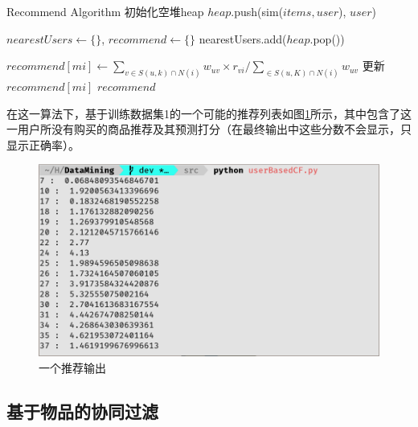 \documentclass{article}
\begin{document}
\begin{simpleAlgorithm}{Recommend Algorithm}
    \State 初始化空堆heap
     
            
                \State \(heap\).push({sim(\(items, user\)), \(user\)})
            \EndIf
        \EndFor
    \EndFor

    \State \(nearestUsers \leftarrow \{\}\), \(recommend \leftarrow \{\}\)
      
        \State nearestUsers.add(\(heap\).pop())
    \EndFor

      
                \State \(recommend[mi] \leftarrow \sum_{v\in S(u,k)\cap N(i)} w_{uv}\times r_{vi} / \sum_{\in S(u,K)\cap N(i)} w_{uv}\)
            \Else
                \State 更新\(recommend[mi]\)
            \EndIf
        \EndFor
    \EndFor
    \State \Return \(recommend\)
    \EndProcedure
\end{simpleAlgorithm}

\par 在这一算法下，基于训练数据集1的一个可能的推荐列表如图\ref{fig:userOutput}所示，其中包含了这一用户所没有购买的商品推荐及其预测打分（在最终输出中这些分数不会显示，只显示正确率）。
\begin{figure}[htpb]
    \centering
    \includegraphics[width=0.9\linewidth]{userOutput.png}
    \caption{一个推荐输出}
    \label{fig:userOutput}
\end{figure}

\subsection{基于物品的协同过滤}
\label{sub:ji_yu_wu_pin_de_xie_tong_guo_lu_}
\end{document}
